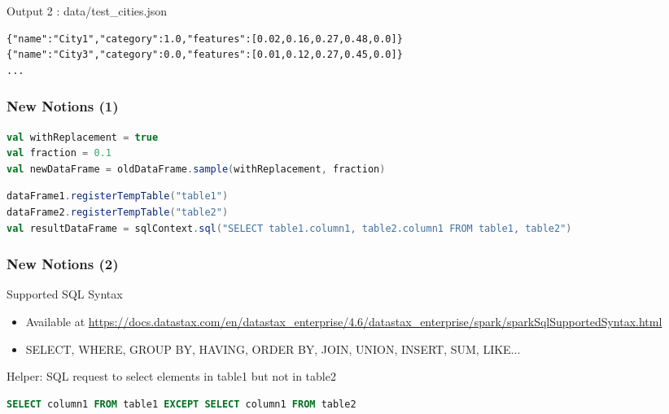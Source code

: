 \documentclass[slidetop,9pt,utf8]{beamer}
\begin{document}
\begin{CJK}{UTF8}{gbsn}
\begin{frame}[fragile]
  \begin{block}{Output 2 : data/test\_cities.json}
    \begin{verbatim}
{"name":"City1","category":1.0,"features":[0.02,0.16,0.27,0.48,0.0]}
{"name":"City3","category":0.0,"features":[0.01,0.12,0.27,0.45,0.0]}
...
    \end{verbatim}
  \end{block}

\end{frame}

\begin{frame}[fragile]
  \frametitle{New Notions (1)}

  \begin{lstlisting}[label=Sampling, caption=Sampling, language=scala, style=code]
val withReplacement = true
val fraction = 0.1
val newDataFrame = oldDataFrame.sample(withReplacement, fraction)
  \end{lstlisting}

  \begin{lstlisting}[label=SQLRequestOnTemporaryTables, caption=SQL Requests on Temporary Tables, language=scala, style=code]
dataFrame1.registerTempTable("table1")
dataFrame2.registerTempTable("table2")
val resultDataFrame = sqlContext.sql("SELECT table1.column1, table2.column1 FROM table1, table2")
  \end{lstlisting}

\end{frame}

\begin{frame}[fragile]
  \frametitle{New Notions (2)}

  \begin{block}{Supported SQL Syntax}
    \begin{itemize}
      \item Available at \tiny\href{http://docs.datastax.com/en/datastax\_enterprise/4.6/datastax\_enterprise/spark/sparkSqlSupportedSyntax.html}{https://docs.datastax.com/en/datastax\_enterprise/4.6/datastax\_enterprise/spark/sparkSqlSupportedSyntax.html}\normalsize
      \item SELECT, WHERE, GROUP BY, HAVING, ORDER BY, JOIN, UNION, INSERT, SUM, LIKE...
    \end{itemize}
  \end{block}

  \begin{block}{Helper: SQL request to select elements in table1 but not in table2}
    \begin{lstlisting}[language=sql]
SELECT column1 FROM table1 EXCEPT SELECT column1 FROM table2
    \end{lstlisting}
  \end{block}


\end{frame}
\end{CJK}
\end{document}
